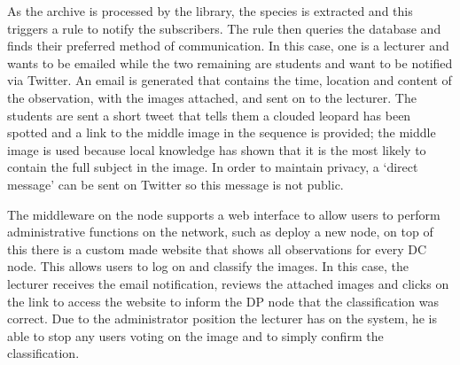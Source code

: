 			As the archive is processed by the library, the species is extracted and this triggers a rule to notify the subscribers. The rule then queries the database and finds their preferred method of communication. In this case, one is a lecturer and wants to be emailed while the two remaining are students and want to be notified via Twitter. An email is generated that contains the time, location and content of the observation, with the images attached, and sent on to the lecturer. The students are sent a short tweet that tells them a clouded leopard has been spotted and a link to the middle image in the sequence is provided; the middle image is used because local knowledge has shown that it is the most likely to contain the full subject in the image. In order to maintain privacy, a `direct message' can be sent on Twitter so this \DIFdelbegin {}\DIFdelend message is not public.

			The middleware on the node supports a web interface to allow users to perform administrative functions on the network, such as deploy a new node, on top of this there is a custom made website that shows all observations for every DC node. This allows users to log on and classify the images. In this case, the lecturer receives the email notification, reviews the attached images and clicks on the link to access the website to inform the DP node that the classification was correct. Due to the administrator position the lecturer has on the system, he is able to stop any users voting on the image and to simply confirm the classification.

			\DIFaddbegin {}

